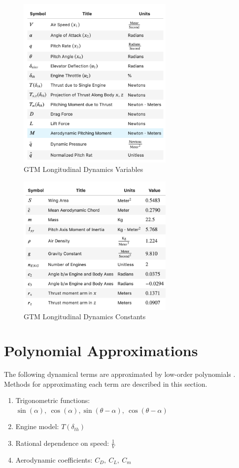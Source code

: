 \documentclass[%
 reprint,
 amsmath,amssymb,
 aps,
]{revtex4-2}
\begin{document}
\begin{figure}
    \centering
    \includegraphics[width=3in]{variables.png}
    \caption{GTM Longitudinal Dynamics Variables}
    \label{fig:variables}
\end{figure}

\begin{figure}
    \centering
    \includegraphics[width=3in]{constants.png}
    \caption{GTM Longitudinal Dynamics Constants}
    \label{fig:variables}
\end{figure}

\section{Polynomial Approximations}

The following dynamical terms are approximated by low-order polynomials \cite{primary}. Methods for approximating each term are described in this section. 

\begin{enumerate}
    \item Trigonometric functions: \\ $\sin{(\alpha)},\ \cos{(\alpha)}, \sin{(\theta - \alpha)},\ \cos{(\theta- \alpha)}$
    \item Engine model: $T(\delta_{th})$
    \item Rational dependence on speed: $\frac{1}{V}$
    \item Aerodynamic coefficients: $C_D,\ C_L,\ C_m$
\end{enumerate}
\end{document}

